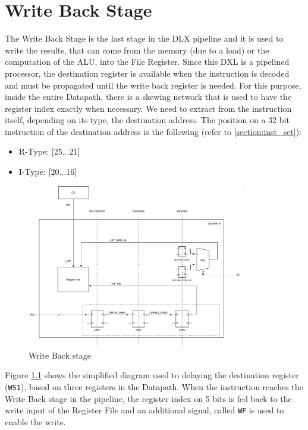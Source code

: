
\chapter{Write Back Stage}
The Write Back Stage is the last stage in the DLX pipeline and it is used to write the results, that can come from the memory (due to a load) or the computation of the ALU, into the File Register.
Since this DXL is a pipelined processor, the destination register is available when the instruction is decoded and must be propagated until the write back register is needed. For this purpose, inside the entire Datapath, there is a skewing network that is used to have the register index exactly when necessary. \newline\newline
We need to extract from the instruction itself, depending on its type, the destination address. The position on a 32 bit instruction of the destination address is the following (refer to \ref{section:inst_set}):
\begin{itemize}
    \itemsep0sp
    \item R-Type: [25...21]
    \item I-Type: [20...16]
\end{itemize}
\begin{figure}[H]   
    \centering
    \includegraphics[width=0.85\textwidth]{chapters/7_WriteBackStage/images/writeback.pdf}
    \caption{Write Back stage}
    \label{fig:wb_stage}
\end{figure}
Figure \ref{fig:wb_stage} shows the simplified diagram used to delaying the destination register (\texttt{WS1}), based on three registers in the Datapath.
When the instruction reaches the Write Back stage in the pipeline, the register index on 5 bits is fed back to the write input of the Register File and an additional signal, called \texttt{WF} is used to enable the write.\newline\newline
